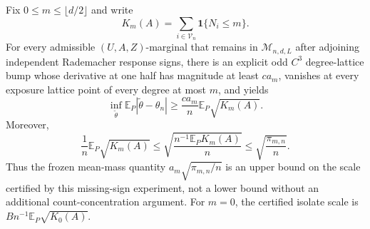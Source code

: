 Fix \(0\leq m\leq\lfloor d/2\rfloor\) and write
\[
 K_m(A)=\sum_{i\in\mathcal V_n}\mathbf1\{N_i\leq m\}.
\]
For every admissible \((U,A,Z)\)-marginal that remains in \(\mathcal M_{n,d,L}\) after adjoining independent Rademacher response signs, there is an explicit odd \(C^3\) degree-lattice bump whose derivative at one half has magnitude at least \(c a_m\), vanishes at every exposure lattice point of every degree at most \(m\), and yields
\[
 \inf_{\widetilde\theta}\mathbb E_P|\widetilde\theta-\theta_n|
 \geq \frac{c a_m}{n}\mathbb E_P\sqrt{K_m(A)}.
\]
Moreover,
\[
 \frac1n\mathbb E_P\sqrt{K_m(A)}
 \leq\sqrt{\frac{n^{-1}\mathbb E_PK_m(A)}{n}}
 \leq\sqrt{\frac{\pi_{m,n}}{n}}.
\]
Thus the frozen mean-mass quantity \(a_m\sqrt{\pi_{m,n}/n}\) is an upper bound on the scale certified by this missing-sign experiment, not a lower bound without an additional count-concentration argument.  For \(m=0\), the certified isolate scale is \(B n^{-1}\mathbb E_P\sqrt{K_0(A)}\).